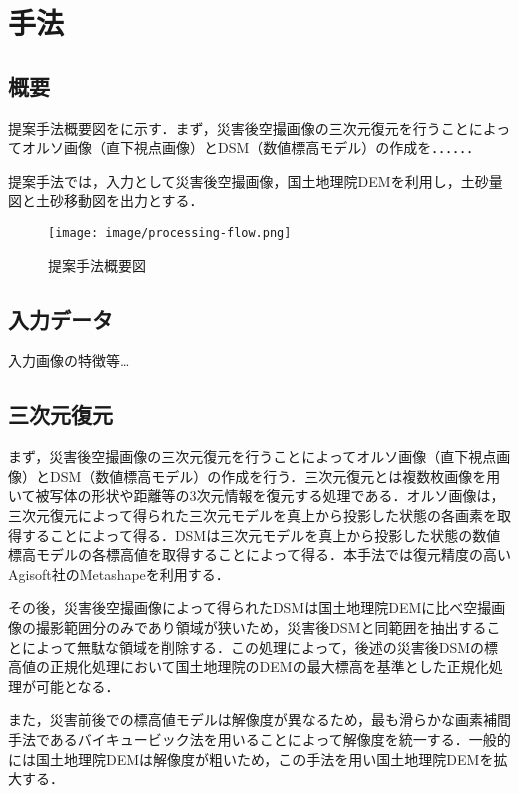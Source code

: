 \chapter{手法}
  \section{概要}
    提案手法概要図をに示す．まず，災害後空撮画像の三次元復元を行うことによってオルソ画像（直下視点画像）とDSM（数値標高モデル）の作成を．．．．．．

    提案手法では，入力として災害後空撮画像，国土地理院DEMを利用し，土砂量図と土砂移動図を出力とする．


    \begin{figure}[t]
      \centering
      \texttt{[image: image/processing-flow.png]}
      \caption{提案手法概要図}
      \label{img2-1}
    \end{figure}


  \section{入力データ}
    入力画像の特徴等\dots



  \section{三次元復元}
    まず，災害後空撮画像の三次元復元を行うことによってオルソ画像（直下視点画像）とDSM（数値標高モデル）の作成を行う．三次元復元とは複数枚画像を用いて被写体の形状や距離等の3次元情報を復元する処理である．オルソ画像は，三次元復元によって得られた三次元モデルを真上から投影した状態の各画素を取得することによって得る．DSMは三次元モデルを真上から投影した状態の数値標高モデルの各標高値を取得することによって得る．本手法では復元精度の高いAgisoft社のMetashape\cite{使用手法1}を利用する．

    その後，災害後空撮画像によって得られたDSMは国土地理院DEMに比べ空撮画像の撮影範囲分のみであり領域が狭いため，災害後DSMと同範囲を抽出することによって無駄な領域を削除する．この処理によって，後述の災害後DSMの標高値の正規化処理において国土地理院のDEMの最大標高を基準とした正規化処理が可能となる．
  
    また，災害前後での標高値モデルは解像度が異なるため，最も滑らかな画素補間手法であるバイキュービック法\cite{論文手法1}を用いることによって解像度を統一する．一般的には国土地理院DEMは解像度が粗いため，この手法を用い国土地理院DEMを拡大する．
    
